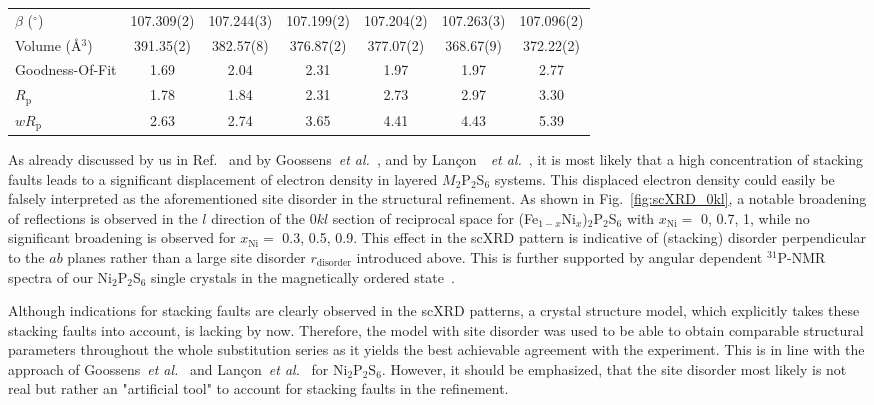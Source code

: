 \documentclass[twocolumn,superscriptaddress,prb,preprintnumbers,nobibnotes,aps]{revtex4-2}  %
\begin{document}
\begin{table*}[tb]
\begin{tabular}{lcccccc}
$\beta$ ($^\circ$) & 107.309(2) & 107.244(3) & 107.199(2) & 107.204(2) & 107.263(3) & 107.096(2) \\
Volume (\r{A}$^3$) & 391.35(2) & 382.57(8) & 376.87(2) & 377.07(2) & 368.67(9) & 372.22(2) \\
Goodness-Of-Fit & 1.69 & 2.04 & 2.31 & 1.97 & 1.97 & 2.77 \\
$R_\textrm{p}$ & 1.78 & 1.84 & 2.31 & 2.73 & 2.97 & 3.30 \\
$wR_\textrm{p}$ & 2.63 & 2.74 & 3.65 & 4.41 & 4.43 & 5.39 \\
\hline \hline
\end{tabular}
\label{tab:lattice_parameter_scXRD_pXRD}
\end{table*}

As already discussed by us in Ref.~\cite{Dioguardi2020} and by Goossens~\textit{et al.}~\cite{Goossens2011}, and by Lan\c{c}on~~\textit{et al.}~\cite{Lancon2018}, it is most likely that a high concentration of stacking faults leads to a significant displacement of electron density in layered $M_2$P$_2$S$_6$ systems. This displaced electron density could easily be falsely interpreted as the aforementioned site disorder in the structural refinement. As shown in Fig.~\ref{fig:scXRD_0kl}, a notable broadening of reflections is observed in the $l$ direction of the $0kl$ section of reciprocal space for (Fe$_{1-x}$Ni$_x$)$_2$P$_2$S$_6$ with $x_\textrm{Ni} =$ 0, 0.7, 1, while no significant broadening is observed for $x_\textrm{Ni} =$ 0.3, 0.5, 0.9. This effect in the scXRD pattern is indicative of (stacking) disorder perpendicular to the $ab$ planes rather than a large site disorder $r_{\textrm{disorder}}$ introduced above. This is further supported by angular dependent $^{31}$P-NMR spectra of our Ni$_2$P$_2$S$_6$ single crystals in the magnetically ordered state~\cite{Dioguardi2020}.

Although indications for stacking faults are clearly observed in the scXRD patterns, a crystal structure model, which explicitly takes these stacking faults into account, is lacking by now. Therefore, the model with site disorder was used to be able to obtain comparable structural parameters throughout the whole substitution series as it yields the best achievable agreement with the experiment. This is in line with the approach of Goossens~\textit{et al.}~\cite{Goossens2011} and Lan\c{c}on~\textit{et al.}~\cite{Lancon2018} for Ni$_2$P$_2$S$_6$. However, it should be emphasized, that the site disorder most likely is not real but rather an "artificial tool" to account for stacking faults in the refinement.
\end{document}
